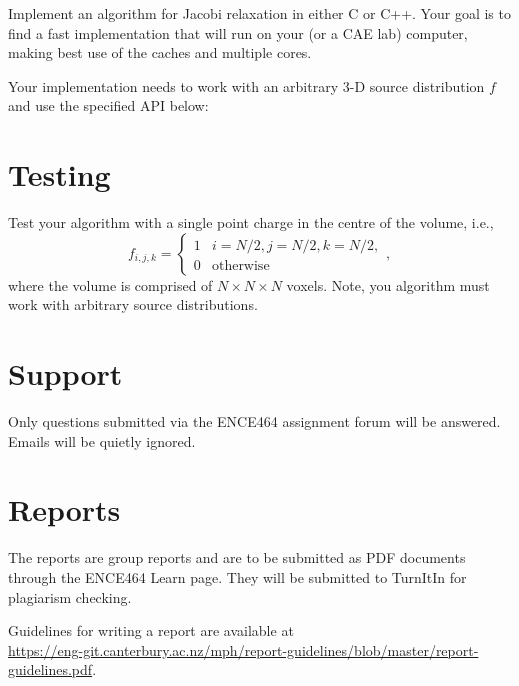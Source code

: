 \documentclass[a4paper,11pt]{article}
\begin{document}
Implement an algorithm for Jacobi relaxation in either C or C++.  Your
goal is to find a fast implementation that will run on your (or a CAE
lab) computer, making best use of the caches and multiple cores.

Your implementation needs to work with an arbitrary 3-D source
distribution $f$ and use the specified API below:


\lstset{language=C}
\lstset{basicstyle=\ttfamily\small}
\lstset{breaklines}



\section{Testing}

Test your algorithm with a single point charge in the centre of the
volume, i.e.,
%
\begin{equation}
  f_{i,j,k} = \left\{
  \begin{array}{ll}
    1 & i=N/2, j=N/2, k=N/2, \\
    0 & \mbox{otherwise}
  \end{array}\right.,
\end{equation}
%
where the volume is comprised of $N \times N \times N$ voxels.  Note,
you algorithm must work with arbitrary source distributions.




\section{Support}

Only questions submitted via the ENCE464 assignment forum will be
answered.  Emails will be quietly ignored.


\section{Reports}

The reports are group reports and are to be submitted as PDF documents
through the ENCE464 Learn page.  They will be submitted to TurnItIn
for plagiarism checking.

Guidelines for writing a report are available at\\
\url{https://eng-git.canterbury.ac.nz/mph/report-guidelines/blob/master/report-guidelines.pdf}.
\end{document}
